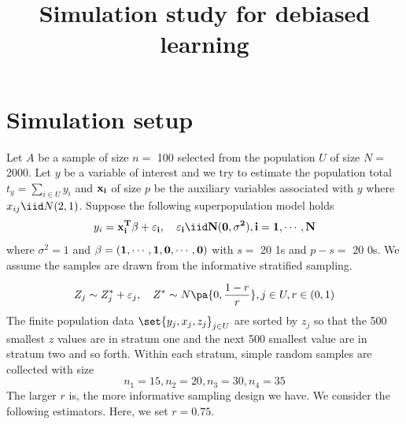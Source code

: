 \documentclass[
]{article}
\title{Simulation study for debiased learning}
\author{}
\date{\vspace{-2.5em}}
\begin{document}
\maketitle

\hypertarget{simulation-setup}{%
\section{Simulation setup}\label{simulation-setup}}

Let \(A\) be a sample of size \(n =\) 100 selected from the population
\(U\) of size \(N =\) 2000. Let \(y\) be a variable of interest and we
try to estimate the population total \(t_y = \sum_{i \in U} y_i\) and
\(\bf x_{i}\) of size \(p\) be the auxiliary variables associated with
\(y\) where \(x_{ij} \iid N(2, 1)\). Suppose the following
superpopulation model holds \[
y_i = \bf x_i^T \bf \beta + \varepsilon_i, \quad \varepsilon_i \iid N(0,\sigma^2), i = 1, \cdots, N
\] where \(\sigma^2 = 1\) and
\(\bf \beta = (1, \cdots, 1, 0, \cdots, 0)\) with \(s =\) 20 1s and
\(p - s =\) 20 0s. We assume the samples are drawn from the informative stratified sampling.

    $$
    Z_j \sim Z_j^* + \varepsilon_j, \quad Z^* \sim N\pa{0, \frac{1 - r}{r}}, j \in U, r \in (0, 1)
    $$
    The finite population data $\set{y_j, x_j, z_j}_{j \in U}$ are sorted by $z_j$ so that the 500 smallest $z$ values are in stratum one and the next 500 smallest value are in stratum two and so forth. Within each stratum, simple random samples are collected with size
    $$
    n_1 = 15, n_2 = 20, n_3 = 30, n_4 = 35
    $$
The larger $r$ is, the more informative sampling design we have. We consider the following estimators. Here, we set $r = 0.75$.
\end{document}
